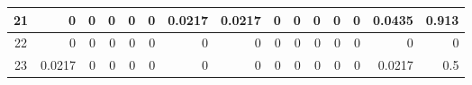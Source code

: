 \begin{table}[hb!]
\begin{adjustbox}{width = \textwidth, center}
\begin{tabular}{|c|r|r|r|r|r|r|r|r|r|r|r|r|r|r|}
        \rowcolor[HTML]{FFFFFF} 
        \cellcolor[HTML]{CFE2F3}21                                  & 0                                              & 0                                              & 0                                              & 0                                              & 0                                              & \cellcolor[HTML]{C7E9D8}0.0217                 & \cellcolor[HTML]{C7E9D8}0.0217                 & 0                                               & 0                                               & 0                                               & 0                                               & 0                                               & \cellcolor[HTML]{D9D2E9}0.0435                                                  & \cellcolor[HTML]{D9D2E9}0.913                                                         \\ \hline
        \rowcolor[HTML]{FFFFFF} 
        \cellcolor[HTML]{CFE2F3}22                                  & 0                                              & 0                                              & 0                                              & 0                                              & 0                                              & 0                                              & 0                                              & 0                                               & 0                                               & 0                                               & 0                                               & 0                                               & \cellcolor[HTML]{D9D2E9}0                                                       & \cellcolor[HTML]{D9D2E9}0                                                             \\ \hline
        \rowcolor[HTML]{FFFFFF} 
        \cellcolor[HTML]{CFE2F3}23                                  & \cellcolor[HTML]{C7E9D8}0.0217                 & 0                                              & 0                                              & 0                                              & 0                                              & 0                                              & 0                                              & 0                                               & 0                                               & 0                                               & 0                                               & 0                                               & \cellcolor[HTML]{D9D2E9}0.0217                                                  & \cellcolor[HTML]{D9D2E9}0.5                                                           \\ \hline

\end{tabular}
\end{adjustbox}
\end{table}
